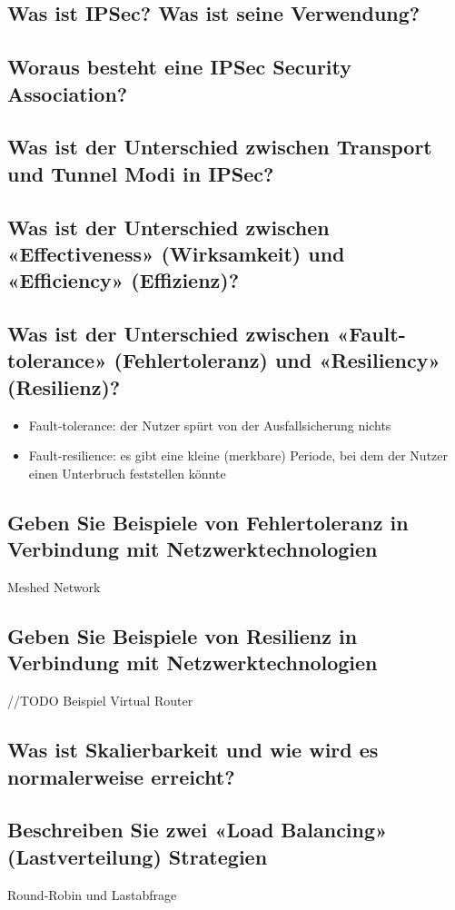 \subsection*{Was ist IPSec? Was ist seine Verwendung?}

\subsection*{Woraus besteht eine IPSec Security Association?}
\subsection*{Was ist der Unterschied zwischen Transport und Tunnel Modi in IPSec?}

\subsection*{Was ist der Unterschied zwischen «Effectiveness» (Wirksamkeit) und «Efficiency» (Effizienz)?}
\subsection*{Was ist der Unterschied zwischen «Fault-tolerance» (Fehlertoleranz) und «Resiliency» (Resilienz)?}
\begin{itemize}
    \item Fault-tolerance: der Nutzer spürt von der Ausfallsicherung nichts
    \item Fault-resilience: es gibt eine kleine (merkbare) Periode, bei dem der Nutzer einen Unterbruch feststellen könnte
\end{itemize}
\subsection*{Geben Sie Beispiele von Fehlertoleranz in Verbindung mit Netzwerktechnologien}
Meshed Network
\subsection*{Geben Sie Beispiele von Resilienz in Verbindung mit Netzwerktechnologien}
//TODO Beispiel Virtual Router
\subsection*{Was ist Skalierbarkeit und wie wird es normalerweise erreicht?}

\subsection*{Beschreiben Sie zwei «Load Balancing» (Lastverteilung) Strategien}
Round-Robin und Lastabfrage
